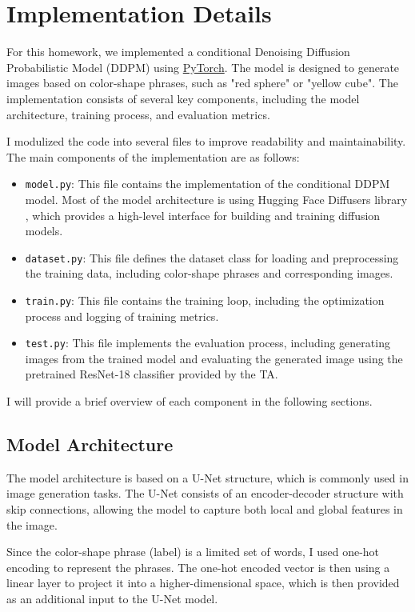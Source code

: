 \section{Implementation Details}
\label{sec:implementation}

For this homework, we implemented a conditional Denoising Diffusion Probabilistic Model (DDPM) using \href{https://pytorch.org/}{PyTorch}.
The model is designed to generate images based on color-shape phrases, such as "red sphere" or "yellow cube". The implementation consists of several key components, including the model architecture, training process, and evaluation metrics.

I modulized the code into several files to improve readability and maintainability. The main components of the implementation are as follows:
\begin{itemize}
    \item \texttt{model.py}: This file contains the implementation of the conditional DDPM model. Most of the model architecture is using Hugging Face Diffusers library \cite{HuggingFace}, which provides a high-level interface for building and training diffusion models.
    \item \texttt{dataset.py}: This file defines the dataset class for loading and preprocessing the training data, including color-shape phrases and corresponding images.
    \item \texttt{train.py}: This file contains the training loop, including the optimization process and logging of training metrics.
    \item \texttt{test.py}: This file implements the evaluation process, including generating images from the trained model and evaluating the generated image using the pretrained ResNet-18 classifier provided by the TA.
\end{itemize}

I will provide a brief overview of each component in the following sections.

\subsection{Model Architecture}
\label{sec:model_architecture}
The model architecture is based on a U-Net structure, which is commonly used in image generation tasks.
The U-Net consists of an encoder-decoder structure with skip connections, allowing the model to capture both local and global features in the image.

Since the color-shape phrase (label) is a limited set of words, I used one-hot encoding to represent the phrases. The one-hot encoded vector is then using a linear layer to project it into a higher-dimensional space, which is then provided as an additional input to the U-Net model.

